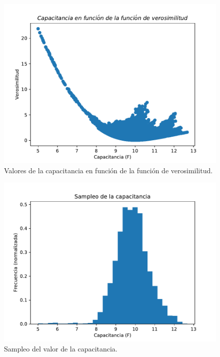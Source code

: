\documentclass[12pt,letterpaper]{article}
\begin{document}
\begin{figure}[H]
\includegraphics{c_verosimilitud.pdf}
\caption{Valores de la capacitancia en función de la función de verosimilitud.}
\centering
\end{figure}

\begin{figure}[H]
\includegraphics{c_hist.pdf}
\caption{Sampleo del valor de la capacitancia.}
\centering
\end{figure}
\end{document}
